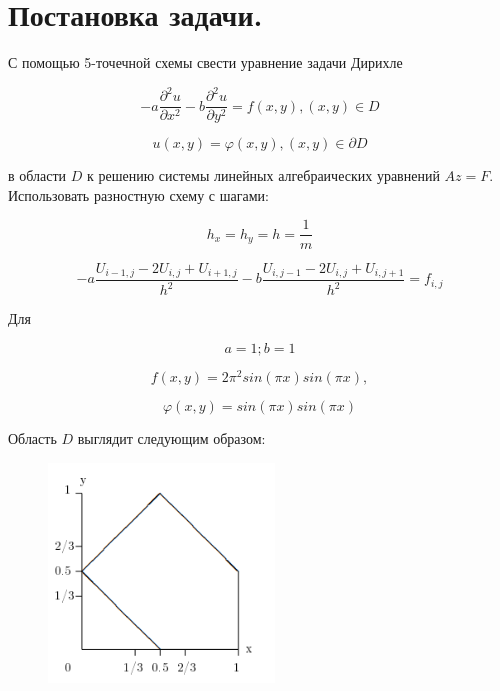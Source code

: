 \documentclass[12pt,a4paper]{scrartcl}
\begin{document}


\newpage

\section{Постановка задачи.}

С помощью 5-точечной схемы свести уравнение задачи Дирихле

\[
    -a{\dfrac{{\partial}^2 u}{\partial x^{2}}}-b{\dfrac{{\partial}^2 u}{\partial y^{2}}}=f(x,y), (x,y)\in D 
\]

\[
    u(x,y)= \varphi(x,y), (x,y)\in \partial D
\]

в области $D$ к решению системы линейных алгебраических уравнений $ Az = F $.
Использовать разностную схему с шагами:

\[
    h_x=h_y=h=\frac{1}{m}
\]

\[
    -a\dfrac{U_{i-1,j}-2U_{i,j}+U_{i+1,j}}{h^2}-b\dfrac{U_{i,j-1}-2U_{i,j}+U_{i,j+1}}{h^2}=f_{i,j}
\]

Для

\[
    a=1; b=1
\]

\[
    f(x,y)=2\pi^2sin(\pi x)sin(\pi x),
\]

\[
     \varphi(x,y)=sin(\pi x)sin(\pi x)
\]

Область $D$ выглядит следующим образом:

\begin{figure}[h]
    \centering
    \includegraphics[width=6cm]{img/domain.png}
\end{figure}
\end{document}
